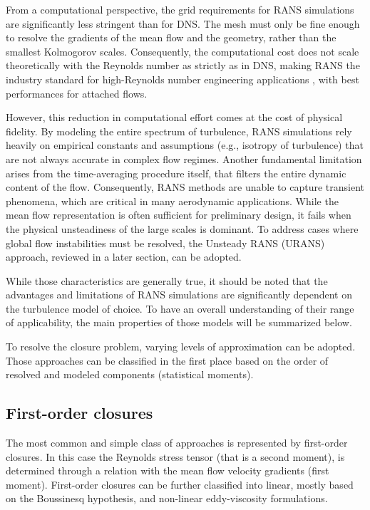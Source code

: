 \documentclass[12pt, a4paper, twoside, openright]{book}
\begin{document}
From a computational perspective, the grid requirements for RANS simulations are significantly less stringent than for DNS. The mesh must only be fine enough to resolve the gradients of the mean flow and the geometry, rather than the smallest Kolmogorov scales. Consequently, the computational cost does not scale theoretically with the Reynolds number as strictly as in DNS, making RANS the industry standard for high-Reynolds number engineering applications \cite{cfd-blazek}, with best performances for attached flows.

However, this reduction in computational effort comes at the cost of physical fidelity. By modeling the entire spectrum of turbulence, RANS simulations rely heavily on empirical constants and assumptions (e.g., isotropy of turbulence) that are not always accurate in complex flow regimes. Another fundamental limitation arises from the time-averaging procedure itself, that filters the entire dynamic content of the flow. Consequently, RANS methods are unable to capture transient phenomena, which are critical in many aerodynamic applications. While the mean flow representation is often sufficient for preliminary design, it fails when the physical unsteadiness of the large scales is dominant. To address cases where global flow instabilities must be resolved, the Unsteady RANS (URANS) approach, reviewed in a later section, can be adopted.

While those characteristics are generally true, it should be noted that the advantages and limitations of RANS simulations are significantly dependent on the turbulence model of choice. To have an overall understanding of their range of applicability, the main properties of those models will be summarized below.

To resolve the closure problem, varying levels of approximation can be adopted. Those approaches can be classified in the first place based on the order of resolved and modeled components (statistical moments).

\subsection{First-order closures}
\label{sec:first-order-closures}
The most common and simple class of approaches is represented by first-order closures. In this case the Reynolds stress tensor (that is a second moment), is determined through a relation with the mean flow velocity gradients (first moment). First-order closures can be further classified into linear, mostly based on the Boussinesq hypothesis, and non-linear eddy-viscosity formulations.
\end{document}
